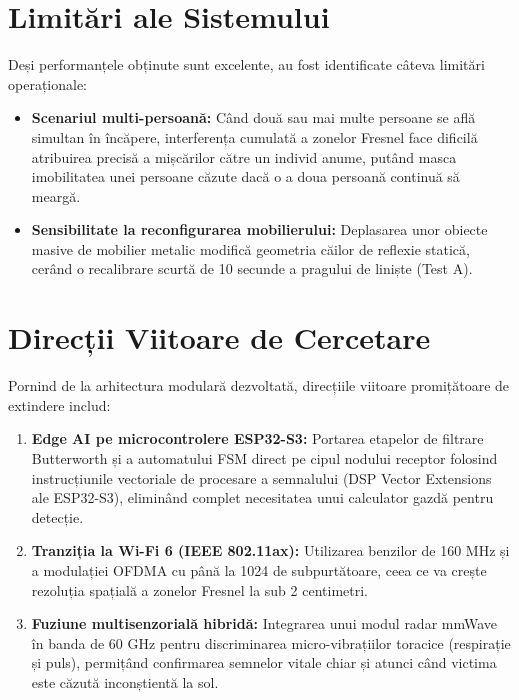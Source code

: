 \section{Limitări ale Sistemului}
Deși performanțele obținute sunt excelente, au fost identificate câteva limitări operaționale:
\begin{itemize}
    \item \textbf{Scenariul multi-persoană:} Când două sau mai multe persoane se află simultan în încăpere, interferența cumulată a zonelor Fresnel face dificilă atribuirea precisă a mișcărilor către un individ anume, putând masca imobilitatea unei persoane căzute dacă o a doua persoană continuă să meargă.
    \item \textbf{Sensibilitate la reconfigurarea mobilierului:} Deplasarea unor obiecte masive de mobilier metalic modifică geometria căilor de reflexie statică, cerând o recalibrare scurtă de 10 secunde a pragului de liniște (Test A).
\end{itemize}

\section{Direcții Viitoare de Cercetare}
Pornind de la arhitectura modulară dezvoltată, direcțiile viitoare promițătoare de extindere includ:
\begin{enumerate}
    \item \textbf{Edge AI pe microcontrolere ESP32-S3:} Portarea etapelor de filtrare Butterworth și a automatului FSM direct pe cipul nodului receptor folosind instrucțiunile vectoriale de procesare a semnalului (DSP Vector Extensions ale ESP32-S3), eliminând complet necesitatea unui calculator gazdă pentru detecție.
    \item \textbf{Tranziția la Wi-Fi 6 (IEEE 802.11ax):} Utilizarea benzilor de 160 MHz și a modulației OFDMA cu până la 1024 de subpurtătoare, ceea ce va crește rezoluția spațială a zonelor Fresnel la sub 2 centimetri.
    \item \textbf{Fuziune multisenzorială hibridă:} Integrarea unui modul radar mmWave în banda de 60 GHz pentru discriminarea micro-vibrațiilor toracice (respirație și puls), permițând confirmarea semnelor vitale chiar și atunci când victima este căzută inconștientă la sol.
\end{enumerate}
